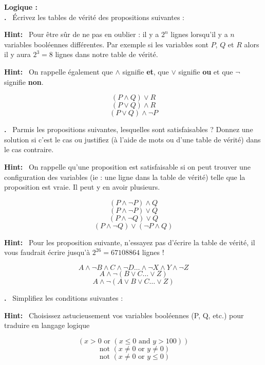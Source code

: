 \documentclass{article}
\newcounter{problem}
\newcounter{solution}
\newcommand\Problem{%
  \stepcounter{problem}%
  \textbf{\theproblem.}~%
  \setcounter{solution}{0}%
}
\newcommand\Hint{%
  \textbf{Hint:}~%
}
\begin{document}
\begin{abstract}
Voilà une petite série d'exercices pour vous entraîner sur les notions de logiques et d'algorithmie que nous avons vu lors des deux premiers cours. À titre indicatif : ce document a été rédigé à l'aide du langage de formatage \TeX\space  inventé par Donald Knuth lorsqu'il rédigeait \textit{The Art Of Computer Programming} en 1977 !
\end{abstract}

\textbf{Logique :}\\

\Problem Écrivez les tables de vérité des propositions suivantes :

\Hint Pour être sûr de ne pas en oublier : il y a \(2^n\) lignes lorsqu'il y a \(n\) variables booléennes différentes. Par exemple si les variables sont \(P\), \(Q\) et \(R\) alors il y aura \(2^3 = 8\) lignes dans notre table de vérité.

\Hint On rappelle également que \(\land\) signifie \textbf{et}, que \(\lor\) signifie \textbf{ou} et que \(\neg\) signifie \textbf{non}.

\[ (P \land Q) \lor R \]
\[ (P \lor Q) \land R \]
\[ (P \lor Q) \land \neg P \]

\Problem Parmis les propositions suivantes, lesquelles sont satisfaisables ? Donnez une solution si c'est le cas ou justifiez (à l'aide de mots ou d'une table de vérité) dans le cas contraire.

\Hint On rappelle qu'une proposition est satisfaisable si on peut trouver une configuration des variables (ie : une ligne dans la table de vérité) telle que la proposition est vraie. Il peut y en avoir plusieurs.

\[ (P \land \neg P) \land Q \]
\[ (P \land \neg P) \lor Q \]
\[ (P \land \neg Q) \lor Q \]
\[ (P \land \neg Q) \lor (\neg P \land Q) \]

\Hint Pour les proposition suivante, n'essayez pas d'écrire la table de vérité, il vous faudrait écrire jusqu'à \(2^{26} = 67108864\) lignes !

\[ A \land \neg B \land C \land \neg D \dots \land \neg X \land Y \land \neg Z \]
\[ A \land \neg (B \lor C \dots \lor Z) \]
\[ A \land \neg (A \lor B \lor C \dots \lor Z) \]


\Problem Simplifiez les conditions suivantes :

\Hint Choisissez astucieusement vos variables booléennes (P, Q, etc.) pour traduire en langage logique

\[ ( x > 0 \text{ or } ( x \leq 0 \text{ and } y > 100 )) \]
\[ \text{ not } (x \neq 0 \text{ or } y \neq 0) \]
\[ \text{ not } (x \neq 0 \text{ or } y \leq 0) \]
\end{document}
